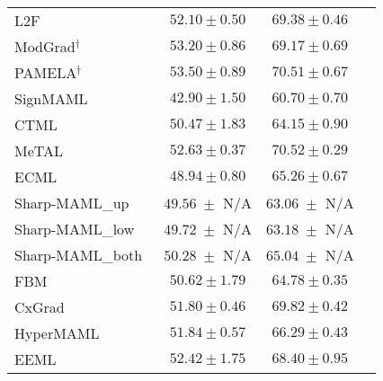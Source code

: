 \begin{table}[t!]
{\begin{tabular}{lccc}
    
    L2F~\cite{baik2020learning}                        & \quad \; $52.10 \pm 0.50$                     & \quad \; $69.38 \pm 0.46$\\
    ModGrad$^{\dagger}$~\cite{simon2020modulating}                 & \quad \; $53.20 \pm 0.86$                     & \quad \; $69.17 \pm 0.69$\\
    PAMELA$^{\dagger}$~\cite{rajasegaran2020meta}                  & \quad \; $53.50 \pm 0.89$                     & \quad \; $70.51 \pm 0.67$\\
    SignMAML~\cite{fan2021sign}                        & \quad \; $42.90 \pm 1.50$                     & \quad \; $60.70 \pm 0.70$\\
    CTML~\cite{peng2021clustered}                      & \quad \; $50.47 \pm 1.83$                     & \quad \; $64.15 \pm 0.90$\\
    MeTAL~\cite{baik2021meta}                        & \quad \; $52.63 \pm 0.37$                     & \quad \; $70.52 \pm 0.29$\\
    ECML~\cite{hiller2022enforcing}                    & \quad \; $48.94 \pm 0.80$                     & \quad \; $65.26 \pm 0.67$\\
    Sharp-MAML\_{up}~\cite{abbas2022sharp}              & \quad \; $49.56\phantom{.} \pm $ N/A          & \quad \; $63.06\phantom{.} \pm $ N/A\\
    Sharp-MAML\_{low}~\cite{abbas2022sharp}             & \quad \; $49.72\phantom{.} \pm $ N/A          & \quad \; $63.18\phantom{.} \pm $ N/A\\
    Sharp-MAML\_{both}~\cite{abbas2022sharp}            & \quad \; $50.28\phantom{.} \pm $ N/A          & \quad \; $65.04\phantom{.} \pm $ N/A\\
    FBM~\cite{yang2022calibrating}                     & \quad \; $50.62 \pm 1.79$                     & \quad \; $64.78 \pm 0.35$\\
    CxGrad~\cite{lee2022contextual}                    & \quad \; $51.80 \pm 0.46$                     & \quad \; $69.82 \pm 0.42$\\
    HyperMAML~\cite{przewikezlikowski2022hypermaml}     & \quad \; $51.84 \pm 0.57$                     & \quad \; $66.29 \pm 0.43$\\
    
    
    
EEML~\cite{li2022eeml}                             & \quad \; $52.42 \pm 1.75$                     & \quad \; $68.40 \pm 0.95$\\
    

\end{tabular}}
\end{table}
